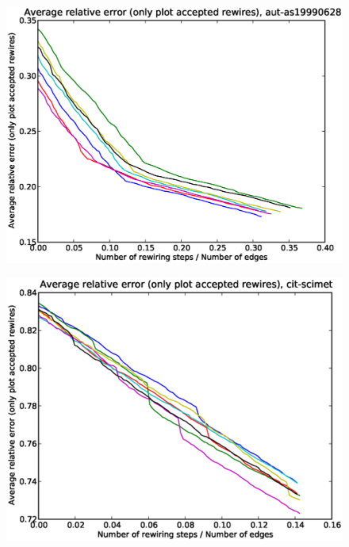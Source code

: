 \documentclass[12pt]{article}
\begin{document}
\begin{figure}[p]
\includegraphics[scale=0.75]{acceptedOnly-aut-as19990628.eps}\\
\end{figure}


\begin{figure}[p]
\includegraphics[scale=0.75]{acceptedOnly-cit-scimet.eps}\\
\end{figure}
\end{document}

